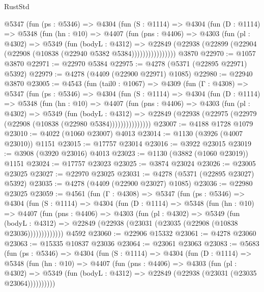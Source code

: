 \begin{lexlean}{RustStd}
\begin{coremodule}
{\begin{coremodule}
{{{{{{{{{{{{{{{{{{{{{{{{{{{{{{{{{{{        @5347
          (fun (ps : @5346) =>
          @4304
            (fun (S : @1114) =>
            @4304
              (fun (D : @1114) =>
              @5348
                (fun (hn : @10) =>
                @4407
                  (fun (pns : @4406) =>
                  @4303
                    (fun (pl : @4302) =>
                    @5349
                      (fun (bodyL : @4312) =>
                      @22849
                        (@22938 (@22899 (@22904 (@22908 (@10838 (@22940 @5382 @5384))))))))))))))))
    @3870
@22970 := @1057 @3870
@22971 := @22970 @5384
@22975 := @4278 (@5371 (@22895 @22971) @5392)
@22979 := @4278 (@4409 (@22900 @22971) @1085)
@22980 := @22940 @3870
@23005 := @4543
    (fun (tail0 : @1067) =>
    @4309
      (fun (Γ : @4308) =>
      @5347
        (fun (ps : @5346) =>
        @4304
          (fun (S : @1114) =>
          @4304
            (fun (D : @1114) =>
            @5348
              (fun (hn : @10) =>
              @4407
                (fun (pns : @4406) =>
                @4303
                  (fun (pl : @4302) =>
                  @5349
                    (fun (bodyL : @4312) =>
                    @22849 (@22938 (@22975 (@22979 (@22908 (@10838 (@22980 @5384)))))))))))))))
@23007 := @4188 @1728 @1079
@23010 := @4022 (@1060 @23007) @4013
@23014 := @1130 (@3926 (@4007 @23010)) @1151
@23015 := @17757 @23014
@23016 := @3922 @23015
@23019 := @3908 (@3920 @23016) @4013
@23023 := @1130 (@3882 (@1060 @23019)) @1151
@23024 := @17757 @23023
@23025 := @3874 @23024
@23026 := @23005 @23025
@23027 := @22970 @23025
@23031 := @4278 (@5371 (@22895 @23027) @5392)
@23035 := @4278 (@4409 (@22900 @23027) @1085)
@23036 := @22980 @23025
@23059 := @4561
    (fun (Γ : @4308) =>
    @5347
      (fun (ps : @5346) =>
      @4304
        (fun (S : @1114) =>
        @4304
          (fun (D : @1114) =>
          @5348
            (fun (hn : @10) =>
            @4407
              (fun (pns : @4406) =>
              @4303
                (fun (pl : @4302) =>
                @5349
                  (fun (bodyL : @4312) =>
                  @22849 (@22938 (@23031 (@23035 (@22908 (@10838 @23036)))))))))))))
    @4592
@23060 := @22906 @15332
@23061 := @4278 @23060
@23063 := @15335 @10837 @23036
@23064 := @23061 @23063
@23083 := @5683
    (fun (ps : @5346) =>
    @4304
      (fun (S : @1114) =>
      @4304
        (fun (D : @1114) =>
        @5348
          (fun (hn : @10) =>
          @4407
            (fun (pns : @4406) =>
            @4303
              (fun (pl : @4302) =>
              @5349 (fun (bodyL : @4312) => @22849 (@22938 (@23031 (@23035 @23064))))))))))
}}}}}}}}}}}}}}}}}}}}}}}}}}}}}}}}}}}
\end{coremodule}}
\end{coremodule}
\end{lexlean}

